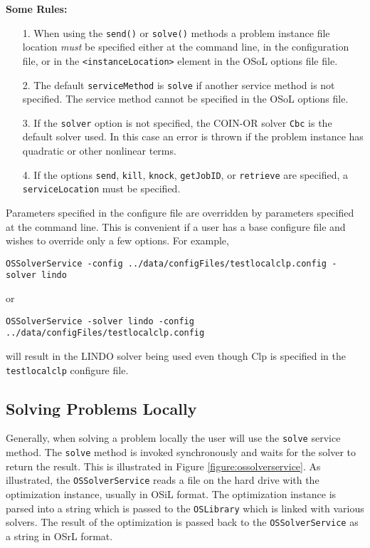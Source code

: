 \documentclass[11pt]{article}
\newcounter{Fig}
\renewcommand{\_}{{\char"5F}}
\renewcommand{\{}{{\char"7B}}
\renewcommand{\}}{{\char"7D}}
\renewcommand{\^}{{\char"0D}}
\renewcommand{\'}{{\char"0D}}
\begin{document}
{\bf Some Rules:}

\begin{itemize}
\item[1.]  When using the {\tt send()} or  {\tt solve()} methods a problem instance file location {\it must} be specified either at  the command line, in the configuration file, or in the {\tt <instanceLocation>} element in the OSoL options file file.

\item[2.]  The default {\tt serviceMethod} is {\tt solve} if another service method is not specified.   The service method cannot be specified in the OSoL options file. 

\item [3.]  If the {\tt solver} option is not specified, the COIN-OR solver {\tt Cbc} is the default solver used. In this case an error is thrown if the problem instance has quadratic or other nonlinear terms. 

\item[4.]  If the options {\tt send}, {\tt kill}, {\tt knock},  {\tt getJobID},  or {\tt retrieve} are specified, a  {\tt serviceLocation} must be specified. 

\end{itemize}



Parameters specified in the configure file are overridden by parameters specified at the command line. This is convenient if a user has a base configure file and wishes to override only a few options. For example,
\begin{verbatim}
OSSolverService -config ../data/configFiles/testlocalclp.config -solver lindo
\end{verbatim}
or
\begin{verbatim}
OSSolverService -solver lindo -config ../data/configFiles/testlocalclp.config 
\end{verbatim}
will result in the LINDO solver being used even though Clp is specified in the {\tt testlocalclp} configure file.



\subsection{Solving Problems Locally}

Generally, when solving a problem locally the user will use the {\tt solve} service method. The {\tt solve} method is invoked synchronously and waits for the solver to return the result.  This is illustrated in Figure \ref{figure:ossolverservice}. As illustrated, the {\tt OSSolverService} reads a file on the hard drive with the optimization instance, usually in OSiL format. The optimization instance is parsed into a string which is passed to the {\tt OSLibrary} which is linked with various solvers. The result of the optimization is passed back to the {\tt OSSolverService} as a string in OSrL format.  
\end{document}
